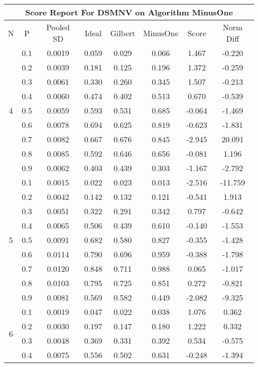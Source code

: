 \documentclass[11pt,a4paper]{report}
\begin{document}
\begin{longtable}{ | c | c || c | c | c | c | c | c | }
\hline
\multicolumn{8}{|c|}{ Score Report For DSMNV on Algorithm MinusOne} \\
\hline
N & P & Pooled SD &  Ideal &  Gilbert & MinusOne  & Score & Norm Diff \\
 \hline
 \hline
 \endhead
\multirow{9}{*}{4} & 0.1 & 0.0019 & 0.059 & 0.029 & 0.066 & 1.467 & -0.220 \\
 & 0.2 & 0.0039 & 0.181 & 0.125 & 0.196 & 1.372 & -0.259 \\
 & 0.3 & 0.0061 & 0.330 & 0.260 & 0.345 & 1.507 & -0.213 \\
 & 0.4 & 0.0060 & 0.474 & 0.402 & 0.513 & 0.670 & -0.539 \\
 & 0.5 & 0.0059 & 0.593 & 0.531 & 0.685 & -0.064 & -1.469 \\
 & 0.6 & 0.0078 & 0.694 & 0.625 & 0.819 & -0.623 & -1.831 \\
 & 0.7 & 0.0082 & 0.667 & 0.676 & 0.845 & -2.945 & 20.091 \\
 & 0.8 & 0.0085 & 0.592 & 0.646 & 0.656 & -0.081 & 1.196 \\
 & 0.9 & 0.0062 & 0.403 & 0.439 & 0.303 & -1.167 & -2.792 \\
 \hline
\multirow{9}{*}{5} & 0.1 & 0.0015 & 0.022 & 0.023 & 0.013 & -2.516 & -11.759 \\
 & 0.2 & 0.0042 & 0.142 & 0.132 & 0.121 & -0.541 & 1.913 \\
 & 0.3 & 0.0051 & 0.322 & 0.291 & 0.342 & 0.797 & -0.642 \\
 & 0.4 & 0.0065 & 0.506 & 0.439 & 0.610 & -0.140 & -1.553 \\
 & 0.5 & 0.0091 & 0.682 & 0.580 & 0.827 & -0.355 & -1.428 \\
 & 0.6 & 0.0114 & 0.790 & 0.696 & 0.959 & -0.388 & -1.798 \\
 & 0.7 & 0.0120 & 0.848 & 0.711 & 0.988 & 0.065 & -1.017 \\
 & 0.8 & 0.0103 & 0.795 & 0.725 & 0.851 & 0.272 & -0.821 \\
 & 0.9 & 0.0081 & 0.569 & 0.582 & 0.449 & -2.082 & -9.325 \\
 \hline
\multirow{9}{*}{6} & 0.1 & 0.0019 & 0.047 & 0.022 & 0.038 & 1.076 & 0.362 \\
 & 0.2 & 0.0030 & 0.197 & 0.147 & 0.180 & 1.222 & 0.332 \\
 & 0.3 & 0.0048 & 0.369 & 0.331 & 0.392 & 0.534 & -0.575 \\
 & 0.4 & 0.0075 & 0.556 & 0.502 & 0.631 & -0.248 & -1.394 \\

\end{longtable}
\end{document}
